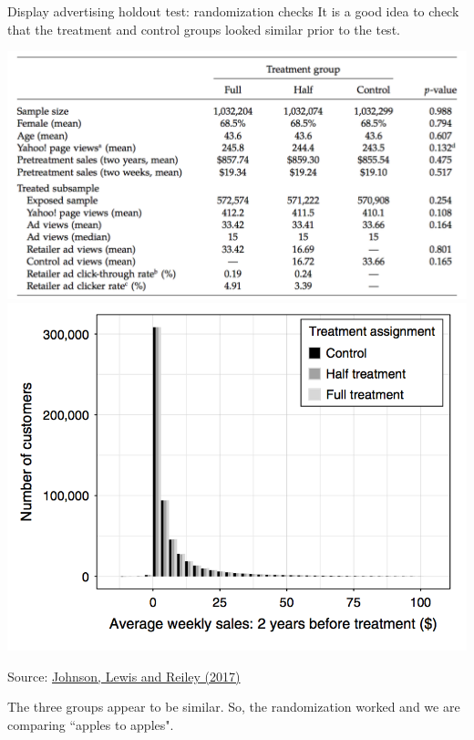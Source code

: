\documentclass[10pt, aspectratio=169]{beamer}
\newcommand{\source}[1]{\begin{flushright} \footnotesize Source: {#1} \end{flushright} \normalsize}
\begin{document}
\begin{frame}{Display advertising holdout test: randomization checks}
It is a good idea to check that the treatment and control groups looked similar prior to the test. \\
\begin{center}
\includegraphics[height=0.4\textheight]{images/johnsonetalrandomizationcheck.png} \vspace{1cm}
\includegraphics[height=0.4\textheight]{images/johnsonetalrandomizationcheck2.png}
\end{center}
\source{\href{https://github.com/eleafeit/ad_response_tutorial/blob/master/Papers/JohnsonLewisReiley2017WhenLessIsMore.pdf}{Johnson, Lewis and Reiley (2017)}}
\alert{The three groups appear to be similar.  So, the randomization worked and we are comparing ``apples to apples".}
\end{frame}
\end{document}
